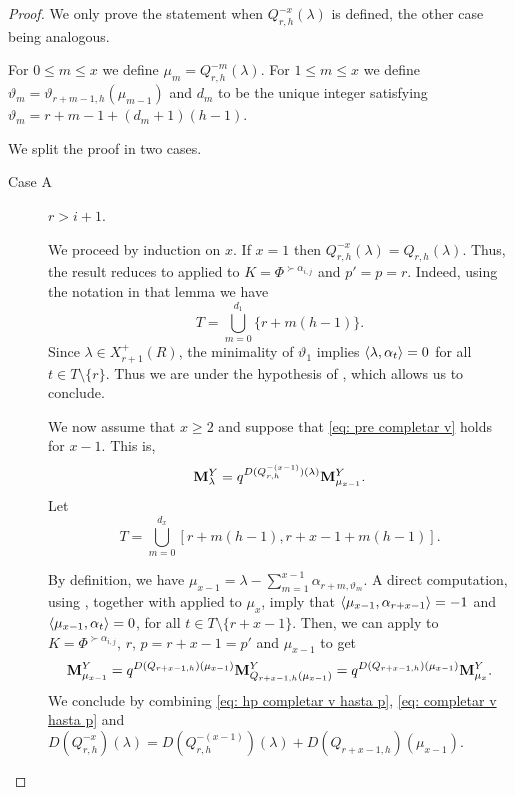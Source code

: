 \begin{proof}
We only prove the statement when $Q^{-x}_{r,h}(\lambda)$ is defined, the other case being analogous. 

For $0\leq m \leq x$ we define $\mu_{m} = Q^{-m}_{r,h}(\lambda)$.
For $1\leq m \leq x$ we define $\vartheta_m=\vartheta_{r+m-1,h}(\mu_{m-1})$ and $d_m$ to be the unique integer satisfying $\vartheta_m =r+m-1+(d_m+1)(h-1) $.  

We split the proof in two cases. 

\begin{description}
    \item[Case A]  $r>i+1 $. 

    We proceed by induction on $x$. 
    If $x=1$ then $Q^{-x}_{r,h}(\lambda)=Q_{r,h}(\lambda)$. 
    Thus, the result reduces to  applied to 
    $K=\Phi^{\succ \alpha_{i,j}}$ and $p'=p=r$.
    Indeed, using the notation in that lemma we have 
    \begin{equation}
     T= \bigcup_{m=0}^{d_1}        \{ r+m(h-1)   \}.   
    \end{equation}
     Since $\lambda \in X^{+}_{r+1}(R)$,  the minimality of $\vartheta_1$ implies  $\langle \lambda , \alpha_{t} \rangle=0$ for all $t\in T\setminus \{r\}$. 
     Thus we are under the hypothesis of , which allows us to conclude.

We now assume that $x\geq 2$ and suppose that \eqref{eq: pre completar v} holds for $x-1$. 
This is, 
   \begin{equation}\label{eq: hp completar v hasta p}
     \displaystyle   \mathbf{M}_{\lambda }^{Y} = q^{D(Q^{-(x-1)}_{r,h})(\lambda)}\mathbf{M}_{\mu_{x-1}}^{Y}.
    \end{equation}
Let 
 \begin{equation}
        T  = \bigcup_{m=0}^{d_x}[r+m(h-1),r+x-1+m(h-1)].
\end{equation}

By definition,  we have  $\displaystyle \mu_{x-1} = \lambda - \sum_{m=1}^{x-1}\alpha_{r+m,\vartheta_{m}}$.
A direct computation, using , together with  applied to $\mu_{x}$, 
imply that   $\langle \mu_{x-1} , \alpha_{r+x-1} \rangle = -1$ and $\langle \mu_{x-1} , \alpha_{t} \rangle = 0$, for all $t\in T\setminus\{r+x-1\}$.
Then, we can apply  to $K=\Phi^{\succ \alpha_{i,j}}$, $r$, $p=r+x-1=p'$ and $\mu_{x-1}$ to get
    \begin{equation}\label{eq: completar v hasta p}
        \mathbf{M}_{\mu_{x-1}}^{Y} = q^{D(Q_{r+x-1,h})(\mu_{x-1})}\mathbf{M}_{Q_{r+x-1,h}(\mu_{x-1})}^{Y}  = q^{D(Q_{r+x-1,h})(\mu_{x-1})}\mathbf{M}_{\mu_x}^{Y}.
    \end{equation}
    We conclude by combining \eqref{eq: hp completar v hasta p}, \eqref{eq: completar v hasta p} and  $D(Q^{-x}_{r,h})(\lambda) = D(Q^{-(x-1)}_{r,h})(\lambda) + D(Q_{r+x-1,h})(\mu_{x-1})$.




\end{description}
\end{proof}
